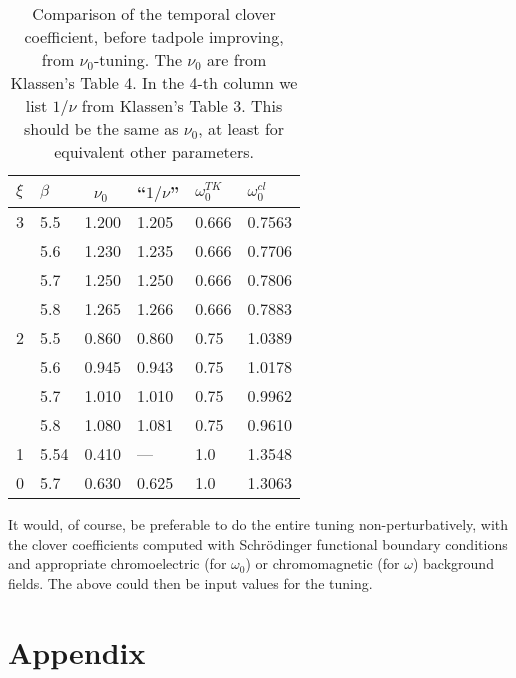 \documentclass[12pt]{article}
\begin{document}
\begin{table} \centering
\begin{tabular}{| l | l | l || l || l || l |}
\hline
$\xi$  & $\beta$ & ~$\nu_0$ & ``$1/\nu$'' & $\omega^{TK}_0$ & 
 $\omega^{cl}_0$ \\ \hline
 3  &   5.5  & 1.200 & 1.205 & 0.666 & 0.7563 \\ %
    &   5.6  & 1.230 & 1.235 & 0.666 & 0.7706 \\ %
    &   5.7  & 1.250 & 1.250 & 0.666 & 0.7806 \\ %
    &   5.8  & 1.265 & 1.266 & 0.666 & 0.7883 \\ %
\hline
 2  &   5.5  & 0.860 & 0.860 & 0.75  & 1.0389 \\ %
    &   5.6  & 0.945 & 0.943 & 0.75  & 1.0178 \\ %
    &   5.7  & 1.010 & 1.010 & 0.75  & 0.9962 \\ %
    &   5.8  & 1.080 & 1.081 & 0.75  & 0.9610 \\ %
\hline
 1  &   5.54 & 0.410 &  ---  & 1.0   & 1.3548 \\
 0  &   5.7  & 0.630 & 0.625 & 1.0   & 1.3063 \\ %
\hline
\end{tabular}
\caption{Comparison of the temporal clover coefficient, before tadpole
improving, from $\nu_0$-tuning. The $\nu_0$ are from Klassen's Table 4.
In the 4-th column we list $1/\nu$ from Klassen's Table 3. This should
be the same as $\nu_0$, at least for equivalent other parameters.}
\label{tab:nu0_tune}
\end{table}

It would, of course, be preferable to do the entire tuning non-perturbatively,
with the clover coefficients computed with Schr\"odinger functional
boundary conditions and appropriate chromoelectric (for $\omega_0$)
or chromomagnetic (for $\omega$) background fields. The above could then
be input values for the tuning.


\section*{Appendix}
\end{document}
